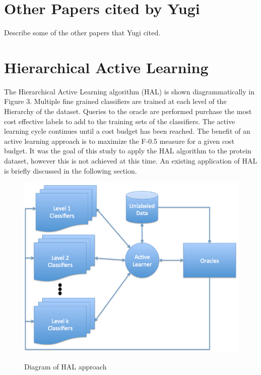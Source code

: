 \documentclass[ms]{nuthesis}
\begin{document}
\section{Other Papers cited by Yugi}
Describe some of the other papers that Yugi cited.

\section{Hierarchical Active Learning}
\par The Hierarchical Active Learning algorithm (HAL) is shown diagrammatically in Figure 3.
Multiple fine grained classifiers are trained at each level of the Hierarchy of the dataset.
Queries to the oracle are performed purchase the most cost effective labels to add to the
training sets of the classifiers. The active learning cycle continues until a cost budget has
been reached. The benefit of an active learning approach is to maximize the F-0.5 measure
for a given cost budget. It was the goal of this study to apply the HAL algorithm to the
protein dataset, however this is not achieved at this time. An existing application of
HAL is briefly discussed in the following section.


\FloatBarrier
\begin{figure}[!htb]
	\centering
    \includegraphics[width=0.5\columnwidth]{fig/AL2}
    \label{fig:AL2}
    \caption{Diagram of HAL approach}
\end{figure}
\FloatBarrier
\end{document}
